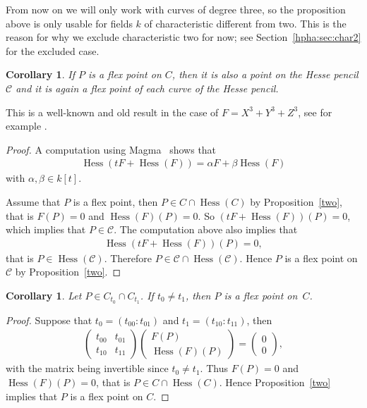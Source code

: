 \documentclass[pdftex]{sigma}
\newcommand{\msetp}[1]{{\left({#1}\right)}}					%
\newcommand{\msets}[1]{{\left[{#1}\right]}}					%
\newcommand{\mhess}[1]{\operatorname{Hess}\msetp{#1}}			%
\numberwithin{equation}{section}
\newtheorem{Corollary}[Theorem]{Corollary}
\begin{document}
From now on we will only work with curves of degree three, so the proposition above is only usable for fields $k$ of characteristic different from two. This is the reason for why we exclude characteristic two for now; see Section~\ref{hpha:sec:char2} for the excluded case.

\begin{Corollary}\label{corthree} If $P$ is a flex point on $C$, then it is also a point on the Hesse pencil $\mathcal{C}$ and it is again a flex point of each curve of the Hesse pencil.
\end{Corollary}

This is a well-known and old result in the case of $F=X^3+Y^3+Z^3$, see for example \cite[Section~VII.1]{pascal1902}.

\begin{proof}A computation using Magma~\cite{bosma1997} shows that
\begin{gather*}
\mhess{tF+\mhess{F}} =\alpha F+\beta \mhess{F}
\end{gather*}
with $\alpha,\beta\in k\msets{t}$.

Assume that $P$ is a flex point, then $P\in C\cap\mhess{C}$ by Proposition~\ref{two}, that is $F\msetp{P}=0$ and $\mhess{F}\msetp{P}=0$. So $\msetp{tF+\mhess{F}}\msetp{P}=0$, which implies that $P\in\mathcal{C}$. The computation above also implies that
\begin{gather*}
\mhess{tF+\mhess{F}}\msetp{P}=0,
\end{gather*}
that is $P\in\mhess{\mathcal{C}}$. Therefore $P\in\mathcal{C}\cap\mhess{\mathcal{C}}$. Hence $P$ is a flex point on $\mathcal{C}$ by Proposi\-tion~\ref{two}.
\end{proof}

\begin{Corollary}\label{hpga:cor:cphpfp}
Let $P\in C_{t_0}\cap C_{t_1}$. If $t_0\neq t_1$, then $P$ is a flex point on~$C$.
\end{Corollary}
\begin{proof}
Suppose that $t_0=\msetp{t_{00}:t_{01}}$ and $t_1=\msetp{t_{10}:t_{11}}$, then
\begin{gather*}
\begin{pmatrix}
t_{00} & t_{01} \\
t_{10} & t_{11}
\end{pmatrix}
\begin{pmatrix}
F\msetp{P} \\
\mhess{F}\msetp{P}
\end{pmatrix}
=
\begin{pmatrix}
0 \\
0
\end{pmatrix},
\end{gather*}
with the matrix being invertible since $t_0\neq t_1$. Thus $F\msetp{P}=0$ and $\mhess{F}\msetp{P}=0$, that is $P\in C\cap\mhess{C}$. Hence Proposition~\ref{two} implies that $P$ is a flex point on $C$.
\end{proof}
\end{document}
